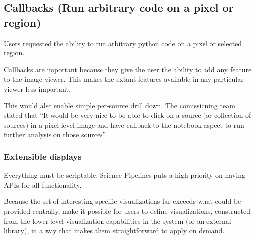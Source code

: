 \subsection{Callbacks (Run arbitrary code on a pixel or region)}

Users requested the ability to run arbitrary python code on a pixel or selected region.

Callbacks are important because they give the user the ability to add any feature to the image viewer.
This makes the extant features available in any particular viewer less important.

This would also enable simple per-source drill down.
The comissioning team stated that  ``It would be very nice to be able to click on a source (or collection of sources) in a pixel-level image and have callback to the notebook aspect to run further analysis on those sources''


\subsubsection{Extensible displays}
Everything must be scriptable.
Science Pipelines puts a high priority on having APIs for all functionality.

Because the set of interesting specific visualizations far exceeds what could be provided centrally, make it possible for users to define visualizations, constructed from the lower-level visualization capabilities in the system (or an external library), in a way that makes them straightforward to apply on demand.

